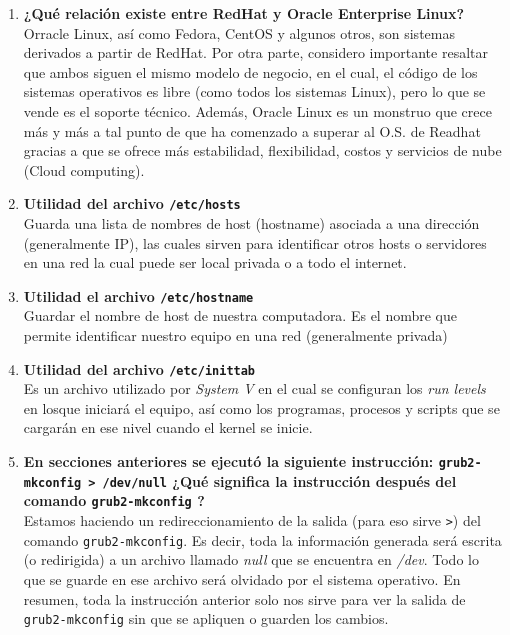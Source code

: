 \documentclass{article}
\begin{document}
\begin{enumerate}[label=\protect\textbf{\Alph*.}]
    \item \textbf{¿Qué relación existe entre RedHat y Oracle Enterprise 
        Linux?}\\
        Orracle Linux, así como Fedora, CentOS y algunos otros, son sistemas 
        derivados a partir de RedHat. Por otra parte, considero importante 
        resaltar que ambos siguen el mismo modelo de negocio, en el cual, el 
        código de los sistemas operativos es libre (como todos los sistemas 
        Linux), pero lo que se vende es el soporte técnico. Además, Oracle 
        Linux es un monstruo que crece más y más a tal punto de que ha comenzado
        a superar al O.S. de Readhat gracias a que se ofrece más estabilidad,
        flexibilidad, costos y servicios de nube (Cloud computing).

    \item \textbf{Utilidad del archivo \texttt{/etc/hosts}}\\
        Guarda una lista de nombres de host (hostname) asociada a una dirección
        (generalmente IP), las cuales sirven para identificar otros hosts o 
        servidores en una red la cual puede ser local privada o a todo el 
        internet.

    \item \textbf{Utilidad el archivo \texttt{/etc/hostname}}\\
        Guardar el nombre de host de nuestra computadora. Es el nombre que 
        permite identificar nuestro equipo en una red (generalmente privada)

    \item \textbf{Utilidad del archivo \texttt{/etc/inittab}}\\
        Es un archivo utilizado por \textit{System V} en el cual se configuran
        los \textit{run levels} en losque iniciará el equipo, así como los 
        programas, procesos y scripts que se cargarán en ese nivel cuando el 
        kernel se inicie.

    \item \textbf{En secciones anteriores se ejecutó la siguiente instrucción: 
        \texttt{grub2-mkconfig > /dev/null} ¿Qué significa la instrucción 
        después del comando \texttt{grub2-mkconfig} ?}\\
        Estamos haciendo un redireccionamiento de la salida (para eso sirve 
        \texttt{>}) del comando \texttt{grub2-mkconfig}. Es decir, toda la
        información generada será escrita (o redirigida) a un archivo llamado
        \textit{null} que se encuentra en \textit{/dev}. Todo lo que se guarde 
        en ese archivo será olvidado por el sistema operativo. En resumen, toda
        la instrucción anterior solo nos sirve para ver la salida de 
        \texttt{grub2-mkconfig} sin que se apliquen o guarden los cambios.
\end{enumerate}
\end{document}
